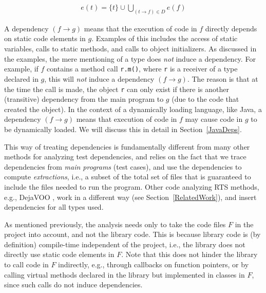 {\begin{eqnarray}
e(t) = \{t\} \cup \bigcup_{(t \rightarrow f)\in D} {e(f)} \nonumber
\end{eqnarray}

A dependency $(f \rightarrow g)$ means that the execution of code in $f$ directly depends on static code
elements in $g$. Examples of this includes the access of static variables, calls to static methods,
and calls to object initializers. As discussed in the examples, the mere mentioning of a type does
\emph{not} induce a dependency. For example, if $f$ contains a method call \texttt{r.m()}, where
\texttt{r} is a receiver of a type declared in $g$, this will \emph{not} induce a dependency $(f \rightarrow g)$. The reason is that at the time the call is made, the object \texttt{r} can only exist if there is another (transitive) dependency from the main program to $g$ (due to the code that created the object). In the context of a dynamically loading language, like Java, a dependency $(f \rightarrow g)$ means that execution of code in $f$ may cause code in $g$ to be dynamically loaded. We will discuss this in detail in Section~\ref{JavaDeps}.

This way of treating dependencies is fundamentally different from many other methods for analyzing test dependencies, and relies on the fact that we trace dependencies from \emph{main programs} (test cases), and use the dependencies to compute \emph{extractions}, i.e., a subset of the total set of files that is guaranteed to include the files needed to run the program.
Other code analyzing RTS methods, e.g., DejaVOO \cite{orso2004scaling}, work in a different way (see Section~\ref{RelatedWork}), and insert dependencies for all types used.

As mentioned previously, the analysis needs only to take the code files $F$ in the project into
account, and not the library code. This is because library code is (by definition) compile-time
independent of the project, i.e., the library does not directly use static code elements in $F$.
Note that this does not hinder the library to call code in $F$ indirectly, e.g., through callbacks
on function pointers, or by calling virtual methods declared in the library but implemented in
classes in $F$, since such calls do not induce dependencies.


}
